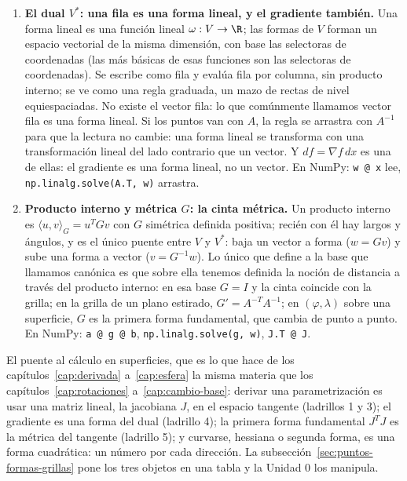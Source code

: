 \begin{enumerate}
  homogéneas. Vale lo mismo para los campos vectoriales, que tiene sentido pensarlos como puntos: en
  esta materia un vector es un mojón visto desde \(O\) o un desplazamiento entre dos. En
  NumPy, punto y desplazamiento son el mismo \texttt{np.array([x, y])}; independencia:
  \texttt{np.linalg.matrix\_rank}.
  \item \textbf{El dual \(V^{*}\): una fila es una forma lineal, y el gradiente también.}
  Una forma lineal es una función lineal \(\omega:V\to\R\); las formas de \(V\) forman un
  espacio vectorial de la misma dimensión, con base las selectoras de coordenadas (las
  más básicas de esas funciones son las selectoras de coordenadas). Se escribe como fila y evalúa fila por columna, sin producto interno; se
  ve como una regla graduada, un mazo de rectas de nivel equiespaciadas. No existe el
  vector fila: lo que comúnmente llamamos vector fila es una forma lineal. Si los puntos van con \(A\), la regla se
  arrastra con \(A^{-1}\) para que la lectura no cambie: una forma lineal se transforma
  con una transformación lineal del lado contrario que un vector. Y \(df=\nabla f\,dx\) es
  una de ellas: el gradiente es una forma lineal, no un vector. En NumPy: \texttt{w @ x} lee,
  \texttt{np.linalg.solve(A.T, w)} arrastra.
  \item \textbf{Producto interno y métrica \(G\): la cinta métrica.} Un producto interno
  es \(\langle u,v\rangle_G=u^TGv\) con \(G\) simétrica definida positiva; recién con él
  hay largos y ángulos, y es el único puente entre \(V\) y \(V^{*}\): baja un vector a forma
  (\(w=Gv\)) y sube una forma a vector (\(v=G^{-1}w\)). Lo único que define a la base que
  llamamos canónica es que sobre ella tenemos definida la noción de distancia a través del
  producto interno: en esa base \(G=I\) y la cinta coincide con la
  grilla; en la grilla de un plano estirado, \(G'=A^{-T}A^{-1}\); en \((\varphi,\lambda)\)
  sobre una superficie, \(G\) es la primera forma fundamental, que cambia de punto a punto.
  En NumPy: \texttt{a @ g @ b}, \texttt{np.linalg.solve(g, w)}, \texttt{J.T @ J}.
\end{enumerate}

El puente al cálculo en superficies, que es lo que hace de los capítulos~\ref{cap:derivada} a~\ref{cap:esfera} la misma
materia que los capítulos~\ref{cap:rotaciones} a~\ref{cap:cambio-base}: derivar una parametrización es usar una matriz lineal, la
jacobiana \(J\), en el espacio tangente (ladrillos 1 y 3); el gradiente es una forma del
dual (ladrillo 4); la primera forma fundamental \(J^TJ\) es la métrica del tangente
(ladrillo 5); y curvarse, hessiana o segunda forma, es una forma cuadrática: un número por
cada dirección. La subsección~\ref{sec:puntos-formas-grillas} pone los tres objetos en
una tabla y la Unidad 0 los manipula.


